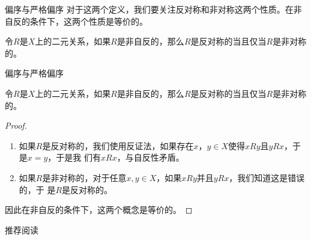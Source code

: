 \documentclass[presentation]{beamer}
\begin{document}
\begin{frame}[label={sec:org64f5ad2}]{偏序与严格偏序}
对于这两个定义，我们要关注反对称和非对称这两个性质。在非自反的条件下，这两个性质是等价的。

\begin{proposition}[]
令\(R\)是\(X\)上的二元关系，如果\(R\)是非自反的，那么\(R\)是反对称的当且仅当\(R\)是非对称的。
\end{proposition}
\end{frame}
\begin{frame}[label={sec:org01e9b27}]{偏序与严格偏序}
\begin{proposition}[]
令\(R\)是\(X\)上的二元关系，如果\(R\)是非自反的，那么\(R\)是反对称的当且仅当\(R\)是非对称的。
\end{proposition}

\begin{proof}
\begin{enumerate}
\item 如果\(R\)是反对称的，我们使用反证法，如果存在\(x\)，\(y\in X\)使得\(xRy\)且\(yRx\)，于是\(x=y\)，于是我
们有\(xRx\)，与自反性矛盾。
\item 如果\(R\)是非对称的，对于任意\(x,y\in X\)，如果\(xRy\)并且\(yRx\)，我们知道这是错误的，于
是\(R\)是反对称的。
\end{enumerate}


因此在非自反的条件下，这两个概念是等价的。
\end{proof}
\end{frame}

\begin{frame}[label={sec:orgade6248}]{推荐阅读}
\href{https://web.stanford.edu/class/archive/cs/cs103/cs103.1198/handouts/070\%20Guide\%20to\%20Set\%20Theory\%20Proofs.pdf}{\color{blue}{Guide to proofs on sets}}
\end{frame}
\end{document}
